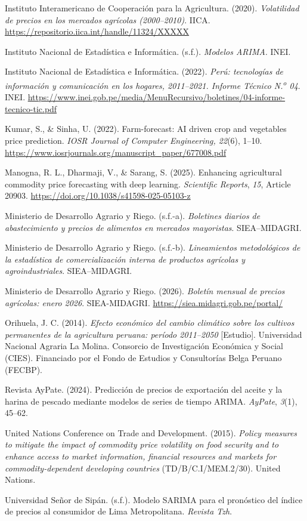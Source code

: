 \documentclass[12pt, a4paper]{report}
\begin{document}
\begin{singlespacing}
\bigskip\noindent
Instituto Interamericano de Cooperación para la Agricultura. (2020).
\textit{Volatilidad de precios en los mercados agrícolas (2000–2010)}. IICA.
\url{https://repositorio.iica.int/handle/11324/XXXXX}

\bigskip\noindent
Instituto Nacional de Estadística e Informática. (s.f.). \textit{Modelos ARIMA}. INEI.

\bigskip\noindent
Instituto Nacional de Estadística e Informática. (2022).
\textit{Perú: tecnologías de información y comunicación en los hogares, 2011–2021.
Informe Técnico N.\textsuperscript{o} 04}. INEI.
\url{https://www.inei.gob.pe/media/MenuRecursivo/boletines/04-informe-tecnico-tic.pdf}

\bigskip\noindent
Kumar, S., \& Sinha, U. (2022). Farm-forecast: AI driven crop and vegetables price prediction. \textit{IOSR Journal of Computer Engineering, 22}(6), 1--10. \url{https://www.iosrjournals.org/manuscript_paper/677008.pdf}

\bigskip\noindent
Manogna, R. L., Dharmaji, V., \& Sarang, S. (2025).
Enhancing agricultural commodity price forecasting with deep learning.
\textit{Scientific Reports}, \textit{15}, Article 20903.
\url{https://doi.org/10.1038/s41598-025-05103-z}

\bigskip\noindent
Ministerio de Desarrollo Agrario y Riego. (s.f.-a). \textit{Boletines diarios de abastecimiento y precios de alimentos en mercados mayoristas}. SIEA--MIDAGRI.

\bigskip\noindent
Ministerio de Desarrollo Agrario y Riego. (s.f.-b). \textit{Lineamientos metodológicos de la estadística de comercialización interna de productos agrícolas y agroindustriales}. SIEA--MIDAGRI.

\bigskip\noindent
Ministerio de Desarrollo Agrario y Riego. (2026).
\textit{Boletín mensual de precios agrícolas: enero 2026}. SIEA-MIDAGRI.
\url{https://siea.midagri.gob.pe/portal/}

\bigskip\noindent
Orihuela, J. C. (2014). \textit{Efecto económico del cambio climático sobre los cultivos permanentes de la agricultura peruana: período 2011--2050} [Estudio]. Universidad Nacional Agraria La Molina. Consorcio de Investigación Económica y Social (CIES). Financiado por el Fondo de Estudios y Consultorías Belga Peruano (FECBP).

\bigskip\noindent
Revista AyPate. (2024). Predicción de precios de exportación del aceite y la harina de pescado mediante modelos de series de tiempo ARIMA. \textit{AyPate}, \textit{3}(1), 45--62.

\bigskip\noindent
United Nations Conference on Trade and Development. (2015). \textit{Policy measures to mitigate the impact of commodity price volatility on food security and to enhance access to market information, financial resources and markets for commodity-dependent developing countries} (TD/B/C.I/MEM.2/30). United Nations.

\bigskip\noindent
Universidad Señor de Sipán. (s.f.). Modelo SARIMA para el pronóstico del índice de precios al consumidor de Lima Metropolitana. \textit{Revista Tzh}.

\end{singlespacing}

\FloatBarrier
\end{document}
